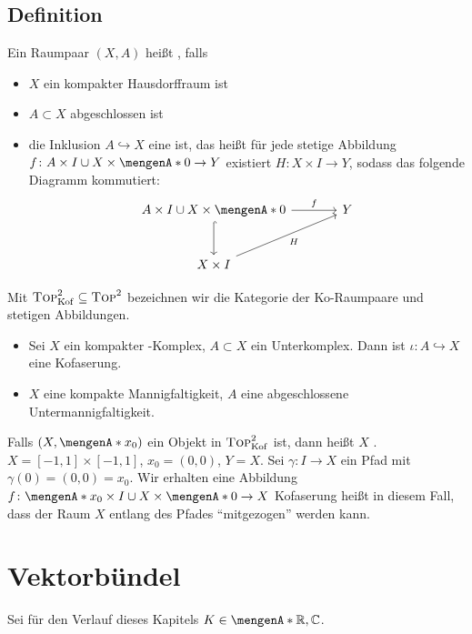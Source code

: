 \subsection[Definition: Ko-Raumpaar und Kofaserung]{Definition} %
\label{sub:13}
Ein Raumpaar $(X,A)$ heißt , falls
\begin{itemize}
	\item $X$ ein kompakter Hausdorffraum ist
	\item $A \subset X$ abgeschlossen ist
	\item die Inklusion $A \hookrightarrow X$ eine  ist, das heißt für jede stetige Abbildung 
	$f \colon A \times I \cup X \times \set{0} \to Y$ existiert 
	$H \colon X \times I \to Y$, sodass das folgende Diagramm kommutiert:
	\[
		\begin{tikzcd}[sep=large]
			A \times I \cup X \times \set{0} \rar["f"] \dar[hook]& Y \\
			X \times I \urar["H"'] & 
		\end{tikzcd}
	\] 
\end{itemize}
Mit $\textsc{Top}^2_{\mathrm{Kof}} \subseteq \textsc{Top}^2$ bezeichnen wir die Kategorie der Ko-Raumpaare und stetigen Abbildungen.
\begin{itemize}
	\item Sei $X$ ein kompakter \CW-Komplex, $A \subset X$ ein Unterkomplex. Dann ist $\iota \colon A \hookrightarrow X$ eine Kofaserung.
	\item $X$ eine kompakte Mannigfaltigkeit, $A$ eine abgeschlossene Untermannigfaltigkeit.
\end{itemize}
Falls $(X, \set{x_0})$ ein Objekt in $\textsc{Top}^2_{\mathrm{Kof}}$ ist, dann heißt $X$ .
$X= [-1,1] \times [-1,1]$, $x_0=(0,0)$, $Y=X$. Sei $\gamma \colon I \to X$ ein Pfad mit $\gamma(0)= (0,0)=x_0$. Wir erhalten eine Abbildung 
$f \colon \set{x_0} \times I \cup  X \times \set{0} \to X $
Kofaserung heißt in diesem Fall, dass der Raum $X$ entlang des Pfades \enquote{mitgezogen} werden kann.
\newpage

\section{Vektorbündel} %
\label{sec:2}
Sei für den Verlauf dieses Kapitels $K \in \set{\mathds{R},\mathds{C}}$. 

